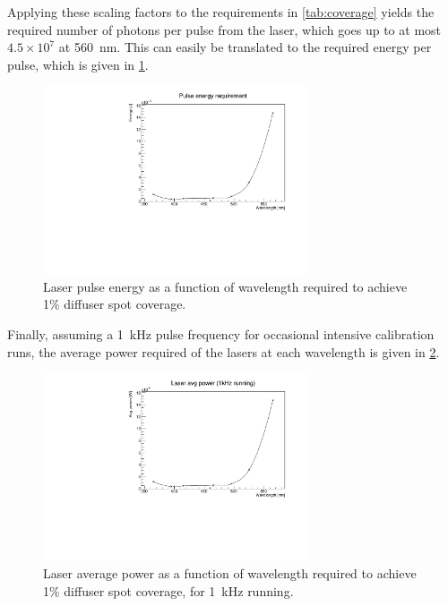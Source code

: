 \documentclass[a4paper,11pt]{article}
\begin{document}
Applying these scaling factors to the requirements in \cref{tab:coverage} yields the required number of photons per pulse from the laser, which goes up to at most $4.5\times10^7$ at 560~nm. This can easily be translated to the required energy per pulse, which is given in \cref{fig:laserenergy}.
\begin{figure}
\centering
\includegraphics[width=0.7\textwidth]{pulseEnergyReqHigh.pdf}
\caption{Laser pulse energy as a function of wavelength required to achieve 1\% diffuser spot coverage.}\label{fig:laserenergy}
\end{figure}
Finally, assuming a 1~kHz pulse frequency for occasional intensive calibration runs, the average power required of the lasers at each wavelength is given in \cref{fig:laserpower}.
\begin{figure}
\centering
\includegraphics[width=0.7\textwidth]{avgPowerReqHigh.pdf}
\caption{Laser average power as a function of wavelength required to achieve 1\% diffuser spot coverage, for 1~kHz running.}\label{fig:laserpower}
\end{figure}
\end{document}
